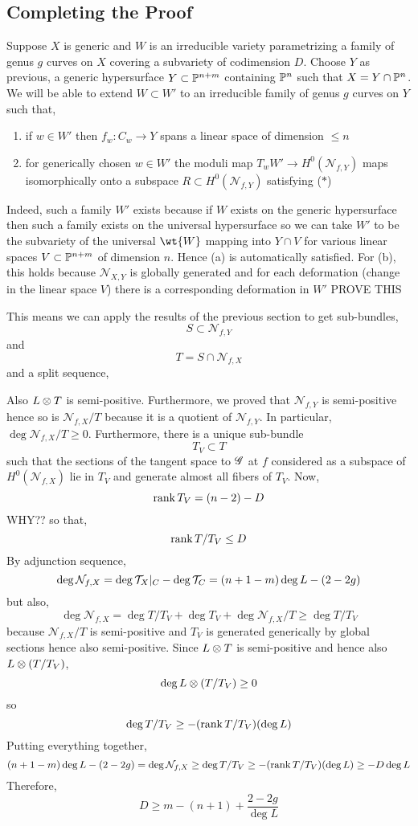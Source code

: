 \documentclass[12pt]{article}
\newcommand{\cN}{\mathcal{N}}
\begin{document}
\subsection{Completing the Proof}

Suppose $X$ is generic and $W$ is an irreducible variety parametrizing a family of genus $g$ curves on $X$ covering a subvariety of codimension $D$. Choose $Y$ as previous, a generic hypersurface $Y \subset \P^{n+m}$ containing $\P^n$ such that $X = Y \cap \P^n$. We will be able to extend $W \subset W'$ to an irreducible family of genus $g$ curves on $Y$ such that,
\begin{enumerate}
\item if $w \in W'$ then $f_w : C_w \to Y$ spans a linear space of dimension $\le n$
\item for generically chosen $w \in W'$ the moduli map $T_w W' \to H^0(\cN_{f, Y})$ maps isomorphically onto a subspace $R \subset H^0(\cN_{f, Y})$ satisfying ($\ast$)
\end{enumerate}

Indeed, such a family $W'$ exists because if $W$ exists on the generic hypersurface then such a family exists on the universal hypersurface so we can take $W'$ to be the subvariety of the universal $\wt{W}$ mapping into $Y \cap V$ for various linear spaces $V \subset \P^{n+m}$ of dimension $n$. Hence (a) is automatically satisfied. For (b), this holds because $\cN_{X,Y}$ is globally generated and for each deformation (change in the linear space $V$) there is a corresponding deformation in $W'$ {\color{red} PROVE THIS}

This means we can apply the results of the previous section to get sub-bundles,
\[ S \subset \cN_{f,Y} \]
and 
\[ T = S \cap \cN_{f,X} \]
and a split sequence,
\begin{center}
\end{center}
Also $L \ot T$ is semi-positive. Furthermore, we proved that $\cN_{f,Y}$ is semi-positive hence so is $\cN_{f,X}/T$ because it is a quotient of $\cN_{f,Y}$. In particular, $\deg{\cN_{f,X}/T} \ge 0$. Furthermore, there is a unique sub-bundle 
\[ T_V \subset T \]
such that the sections of the tangent space to $\G$ at $f$ considered as a subspace of $H^0(\cN_{f,X})$ lie in $T_V$ and generate almost all fibers of $T_V$. Now,
\[ \rank{T_V} = (n-2) - D \]
{\color{red} WHY??}
so that,
\[ \rank{T / T_V} \le D \]
By adjunction sequence,
\[ \deg{\cN_{f,X}} = \deg{\T_X|_C} - \deg{\T_C} = (n+1 - m) \deg{L} - (2 - 2 g) \]
but also,
\[ \deg{\cN_{f,X}} = \deg{T/T_V} + \deg{T_V} + \deg{\cN_{f,X}/T} \ge \deg{T/T_V} \]
because $\cN_{f,X}/T$ is semi-positive and $T_V$ is generated generically by global sections hence also semi-positive. Since $L \ot T$ is semi-positive and hence also $L \ot (T/T_V)$,
\[ \deg{L \ot (T/T_V)} \ge 0 \]
so 
\[ \deg{T/T_V} \ge - (\rank{T/T_V}) (\deg{L}) \]
Putting everything together,
\[ (n+1 - m) \deg{L} - (2 - 2 g) = \deg{\cN_{f,X}} \ge \deg{T/T_V} \ge - (\rank{T/T_V}) (\deg{L}) \ge - D \deg{L} \]
Therefore,
\[ D \ge m - (n+1) + \frac{2 - 2g}{\deg{L}} \]
\end{document}
